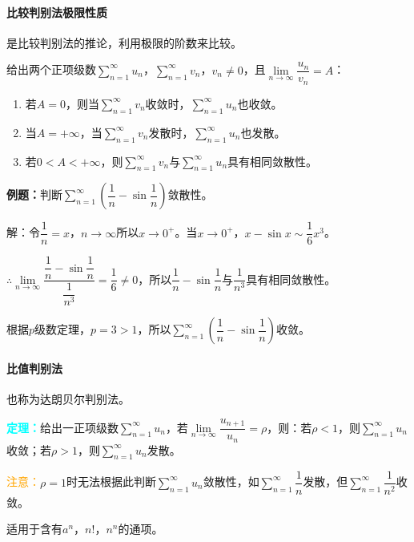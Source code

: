 \documentclass[UTF8, 12pt]{ctexart}
\begin{document}
\paragraph{比较判别法极限性质} \leavevmode \medskip

是比较判别法的推论，利用极限的阶数来比较。

给出两个正项级数$\sum\limits_{n=1}^\infty u_n$，$\sum\limits_{n=1}^\infty v_n$，$v_n\neq0$，且$\lim\limits_{n\to\infty}\dfrac{u_n}{v_n}=A$：

\begin{enumerate}
    \item 若$A=0$，则当$\sum\limits_{n=1}^\infty v_n$收敛时，$\sum\limits_{n=1}^\infty u_n$也收敛。
    \item 当$A=+\infty$，当$\sum\limits_{n=1}^\infty v_n$发散时，$\sum\limits_{n=1}^\infty u_n$也发散。
    \item 若$0<A<+\infty$，则$\sum\limits_{n=1}^\infty v_n$与$\sum\limits_{n=1}^\infty u_n$具有相同敛散性。
\end{enumerate}

\textbf{例题：}判断$\sum\limits_{n=1}^\infty\left(\dfrac{1}{n}-\sin\dfrac{1}{n}\right)$敛散性。

解：令$\dfrac{1}{n}=x$，$n\to\infty$所以$x\to0^+$。当$x\to0^+$，$x-\sin x\sim\dfrac{1}{6}x^3$。

$\therefore\lim\limits_{n\to\infty}\dfrac{\dfrac{1}{n}-\sin\dfrac{1}{n}}{\dfrac{1}{n^3}}=\dfrac{1}{6}\neq0$，所以$\dfrac{1}{n}-\sin\dfrac{1}{n}$与$\dfrac{1}{n^3}$具有相同敛散性。

根据$p$级数定理，$p=3>1$，所以$\sum\limits_{n=1}^\infty\left(\dfrac{1}{n}-\sin\dfrac{1}{n}\right)$收敛。

\paragraph{比值判别法} \leavevmode \medskip

也称为达朗贝尔判别法。

\textcolor{aqua}{\textbf{定理：}}给出一正项级数$\sum\limits_{n=1}^\infty u_n$，若$\lim\limits_{n\to\infty}\dfrac{u_{n+1}}{u_n}=\rho$，则：若$\rho<1$，则$\sum\limits_{n=1}^\infty u_n$收敛；若$\rho>1$，则$\sum\limits_{n=1}^\infty u_n$发散。

\textcolor{orange}{注意：}$\rho=1$时无法根据此判断$\sum\limits_{n=1}^\infty u_n$敛散性，如$\sum\limits_{n=1}^\infty\dfrac{1}{n}$发散，但$\sum\limits_{n=1}^\infty\dfrac{1}{n^2}$收敛。

适用于含有$a^n$，$n!$，$n^n$的通项。
\end{document}
